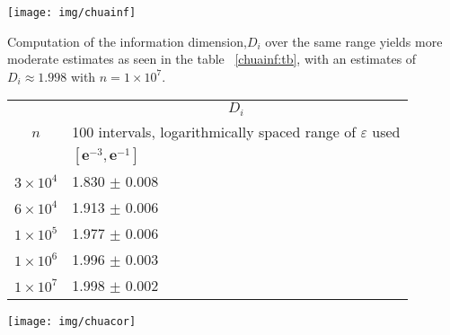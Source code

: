 	\begin{center}
    \texttt{[image: img/chuainf]}
	\label{chuainf:fig}
	\end{center}
Computation of the information dimension,$D_{i}$ over the same range yields more moderate estimates as seen in the table ~\ref{chuainf:tb}, with an estimates of $D_{i} \approx 1.998$ with $n = 1 \times 10^{7}$.
\begin{center}
\begin{tabular}{ |l|l| }

\hline
\multicolumn{1}{|c|}{\multirow{3}{*}{$n$}} & \multicolumn{1}{|c|}{$D_{i} $}\\
\cline{2-2}
&\multicolumn{1}{|c|}{100 intervals, logarithmically spaced range of $\varepsilon$ used}\\
\cline{2-2}
 &\rule{0pt}{12pt}  \hspace{85pt} $[\boldsymbol{e}^{-3},\boldsymbol{e}^{-1}]$  \\
\hline
$3\times 10^{4}$ & \hspace{80pt} 1.830 $\pm$ 0.008  \\
\hline
$6\times 10^{4}$ & \hspace{80pt} 1.913 $\pm$ 0.006 \\
\hline
$1\times 10^{5}$ & \hspace{80pt} 1.977 $\pm$ 0.006 \\
\hline
$1\times 10^{6}$ & \hspace{80pt} 1.996 $\pm$ 0.003  \\
\hline
$1\times 10^{7}$ & \hspace{80pt} 1.998 $\pm$ 0.002  \\
\hline
\end{tabular}
\end{center}

	\begin{center}
	\texttt{[image: img/chuacor]}
	\label{chuacor:fig}
	\end{center}


